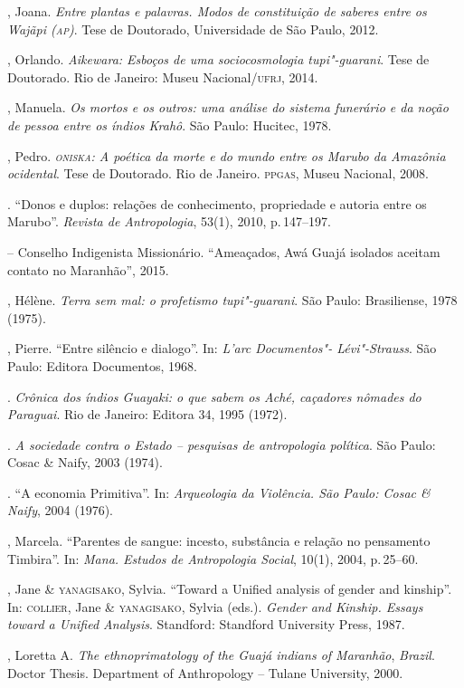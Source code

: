 \begin{bibliohedra}
, Joana. \emph{Entre plantas e palavras. Modos de constituição de
saberes entre os Wajãpi (\textsc{ap})}. Tese de Doutorado, Universidade de São
Paulo, 2012.

, Orlando. \emph{Aikewara: Esboços de uma sociocosmologia tupi"-guarani}. Tese de Doutorado. Rio de Janeiro: Museu Nacional/\textsc{ufrj}, 2014.

, Manuela. \emph{Os mortos e os outros: uma análise do sistema
funerário e da noção de pessoa entre os índios Krahô}. São Paulo:
Hucitec, 1978.

, Pedro. \emph{\textsc{oniska}: A poética da morte e do mundo entre os
Marubo da Amazônia ocidental}. Tese de Doutorado. Rio de Janeiro. \textsc{ppgas},
Museu Nacional, 2008.

\titidem. ``Donos e duplos: relações de conhecimento, propriedade
e autoria entre os Marubo''. \emph{Revista de Antropologia}, 53(1), 2010, p.\,147--197.

 -- Conselho Indigenista Missionário. ``Ameaçados, Awá Guajá isolados aceitam contato no Maranhão'', 2015.

, Hélène. \emph{Terra sem mal: o profetismo tupi"-guarani}.
São Paulo: Brasiliense, 1978 (1975).

, Pierre. ``Entre silêncio e dialogo''. In: \emph{L'arc Documentos"-
Lévi"-Strauss}. São Paulo: Editora Documentos, 1968.

\titidem. \emph{Crônica dos índios Guayaki: o que sabem os
Aché, caçadores nômades do Paraguai}. Rio de Janeiro: Editora 34, 1995 (1972).

\titidem. \emph{A sociedade contra o Estado -- pesquisas de
antropologia política}. São Paulo: Cosac \& Naify, 2003 (1974).

\titidem. ``A economia Primitiva''. In: \emph{Arqueologia da
Violência. São Paulo: Cosac \& Naify}, 2004 (1976).

, Marcela. ``Parentes de sangue: incesto, substância e relação no
pensamento Timbira''. In: \emph{Mana. Estudos de Antropologia Social}, 10(1), 2004, p.\,25--60.

, Jane \& \textsc{yanagisako}, Sylvia.
``Toward a Unified analysis of gender and kinship''. In:
\textsc{collier}, Jane \& \textsc{yanagisako}, Sylvia (eds.). \emph{Gender and Kinship.
Essays toward a Unified Analysis}. Standford: Standford University
Press, 1987.

, Loretta A. \emph{The ethnoprimatology of the Guajá indians of
Maranhão}, \emph{Brazil}. Doctor Thesis. Department of Anthropology --
Tulane University, 2000.


\end{bibliohedra}
